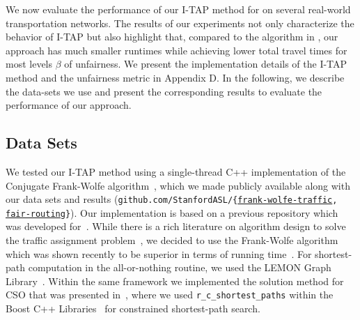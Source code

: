 \documentclass{article}
\newif\ifarxiv   %
\begin{document}

We now evaluate the performance of our I-TAP method for \fso on several real-world transportation networks. The results of our experiments not only characterize the behavior of I-TAP but also highlight that, compared to the algorithm in \cite{so-routing-seminal}, our approach has much smaller runtimes while %
achieving lower total travel times for most levels $\beta$ of unfairness. \ifarxiv In the following, we describe the implementation details of the I-TAP method and the unfairness metric as well as the data-sets we use. We further present the corresponding results to evaluate the performance of our approach. \else We present the implementation details of the I-TAP method and the unfairness metric in Appendix D. In the following, we describe the data-sets we use and present the corresponding results to evaluate the performance of our approach. \fi


\ifarxiv
\subsection{Implementation Details and Data Sets} \label{sec:impl-details}
\else
\subsection{Data Sets} \label{sec:impl-details}
\fi
\ifarxiv
We
tested our I-TAP method using a single-thread C++ implementation of
the Conjugate Frank-Wolfe algorithm~\cite{MitradjievaLindberg13},
which we made publicly available along with our data sets and results ({\small\texttt{github.com\slash StanfordASL\slash \{\href{https://github.com/StanfordASL/frank-wolfe-traffic}{frank-wolfe-traffic}, \href{https://github.com/StanfordASL/fair-routing}{fair-routing}\}}}). Our implementation is based on a previous repository which was developed for~\cite{BuchETAL18}. While there is a rich literature on algorithm design to solve the traffic assignment problem~\cite{BARGERA2002,BARGERA20101022}, we decided to use the Frank-Wolfe algorithm which was shown recently to be superior in terms of running time~\cite{BuchETAL18}. For shortest-path computation in the all-or-nothing routine, we used the LEMON Graph Library~\cite{Lemon}. Within the same framework we implemented the solution method for CSO that was presented in~\cite{so-routing-seminal}, where we used 
\texttt{r\_c\_shortest\_paths} within
the Boost C++ Libraries~\cite{Boost}
for constrained shortest-path search.
\end{document}
